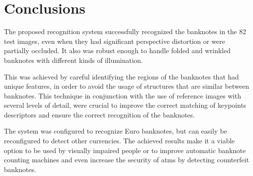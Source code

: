 \section{Conclusions}\label{sec:conclusions}

The proposed recognition system successfully recognized the banknotes in the 82 test images, even when they had significant perspective distortion or were partially occluded. It also was robust enough to handle folded and wrinkled banknotes with different kinds of illumination.

This was achieved by careful identifying the regions of the banknotes that had unique features, in order to avoid the usage of structures that are similar between banknotes. This technique in conjunction with the use of reference images with several levels of detail, were crucial to improve the correct matching of keypoints descriptors and ensure the correct recognition of the banknotes.

The system was configured to recognize Euro banknotes, but can easily be reconfigured to detect other currencies. The achieved results make it a viable option to be used by visually impaired people or to improve automatic banknote counting machines and even increase the security of \glspl{atm} by detecting counterfeit banknotes.
